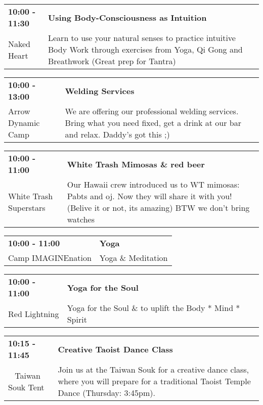 \begin{tabular}{ p{1in} p{2.2in} }
    \textbf{10:00 - 11:30} & \textbf{Using Body-Consciousness as Intuition} \\
    Naked Heart \newline  & Learn to use your natural senses to practice intuitive Body Work through exercises from Yoga, Qi Gong and Breathwork (Great prep for Tantra) \\
    \hline 
\end{tabular}
    
\begin{tabular}{ p{1in} p{2.2in} }
    \textbf{10:00 - 13:00} & \textbf{Welding Services} \\
    Arrow Dynamic Camp \newline  & We are offering our professional welding services.  Bring what you need fixed, get a drink at our bar and relax. Daddy's got this ;) \\
    \hline 
\end{tabular}
    
\begin{tabular}{ p{1in} p{2.2in} }
    \textbf{10:00 - 11:00} & \textbf{White Trash Mimosas \& red beer} \\
    White Trash Superstars \newline  & Our Hawaii crew introduced us to WT mimosas: Pabts and oj. Now they will share it with you! (Belive it or not, its amazing) BTW we don't bring watches \\
    \hline 
\end{tabular}
    
\begin{tabular}{ p{1in} p{2.2in} }
    \textbf{10:00 - 11:00} & \textbf{Yoga} \\
    Camp IMAGINEnation \newline  & Yoga \& Meditation \\
    \hline 
\end{tabular}
    
\begin{tabular}{ p{1in} p{2.2in} }
    \textbf{10:00 - 11:00} & \textbf{Yoga for the Soul} \\
    Red Lightning \newline  & Yoga for the Soul \& to uplift the Body * Mind * Spirit \\
    \hline 
\end{tabular}
    
\begin{tabular}{ p{1in} p{2.2in} }
    \textbf{10:15 - 11:45} & \textbf{Creative Taoist Dance Class} \\
    ~ \newline Taiwan Souk Tent & Join us at the Taiwan Souk for a creative dance class, where you will prepare for a traditional Taoist Temple Dance (Thursday: 3:45pm). \\
    \hline 
\end{tabular}
    
